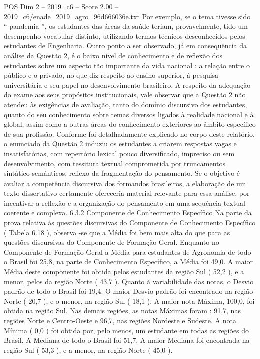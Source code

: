 \begin{textsample}{POS Dim 2 – 2019\_c6 – Score 2.00 – 2019\_c6/enade\_2019\_agro\_96d666036e.txt}
Por exemplo, se o tema tivesse sido “ pandemia ”, os estudantes das áreas da saúde teriam, provavelmente, tido um desempenho vocabular distinto, utilizando termos técnicos desconhecidos pelos estudantes de Engenharia.
Outro ponto a ser observado, já em consequência da análise da Questão 2, é o baixo nível de conhecimento e de reflexão dos estudantes sobre um aspecto tão importante da vida nacional : a relação entre o público e o privado, no que diz respeito ao ensino superior, à pesquisa universitária e seu papel no desenvolvimento brasileiro.
A respeito da adequação do exame aos seus propósitos institucionais, vale observar que a Questão 2 não atendeu às exigências de avaliação, tanto do domínio discursivo dos estudantes, quanto do seu conhecimento sobre temas diversos ligados à realidade nacional e à global, assim como a outras áreas do conhecimento exteriores ao âmbito específico de sua profissão.
Conforme foi detalhadamente explicado no corpo deste relatório, o enunciado da Questão 2 induziu os estudantes a criarem respostas vagas e insatisfatórias, com repertório lexical pouco diversificado, impreciso ou sem desenvolvimento, com tessitura textual comprometida por truncamentos sintático-semânticos, reflexo da fragmentação do pensamento.
Se o objetivo é avaliar a competência discursiva dos formandos brasileiros, a elaboração de um texto dissertativo certamente ofereceria material relevante para essa análise, por incentivar a reflexão e a organização do pensamento em uma sequência textual coerente e complexa. 6.3.2 Componente de Conhecimento Específico Na parte da prova relativa às questões discursivas do Componente de Conhecimento Específico ( Tabela 6.18 ), observa -se que a Média foi bem mais alta do que para as questões discursivas do Componente de Formação Geral.
Enquanto no Componente de Formação Geral a Média para estudantes de Agronomia de todo o Brasil foi 25,8, na parte de Conhecimento Específico, a Média foi 49,0.
A maior Média deste componente foi obtida pelos estudantes da região Sul ( 52,2 ), e a menor, pelos da região Norte ( 43,7 ).
Quanto à variabilidade das notas, o Desvio padrão de todo o Brasil foi 19,4.
O maior Desvio padrão foi encontrado na região Norte ( 20,7 ), e o menor, na região Sul ( 18,1 ).
A maior nota Máxima, 100,0, foi obtida na região Sul.
Nas demais regiões, as notas Máximas foram : 91,7, nas regiões Norte e Centro-Oeste e 96,7, nas regiões Nordeste e Sudeste.
A nota Mínima ( 0,0 ) foi obtida por, pelo menos, um estudante em todas as regiões do Brasil.
A Mediana de todo o Brasil foi 51,7.
A maior Mediana foi encontrada na região Sul ( 53,3 ), e a menor, na região Norte ( 45,0 ).

\end{textsample}
